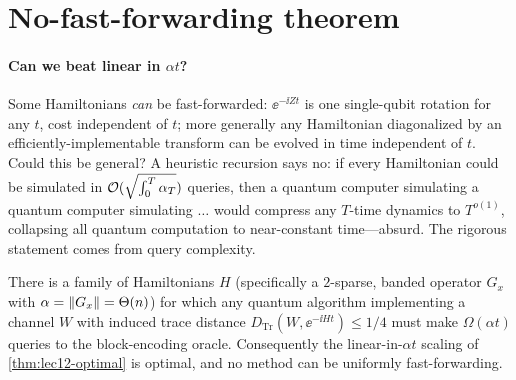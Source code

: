 \section{No-fast-forwarding theorem}
\label{sec:lec12-5}

\paragraph{Can we beat linear in $\alpha t$?}
Some Hamiltonians \emph{can} be fast-forwarded: $\ee^{-\ii Zt}$ is one single-qubit
rotation for any $t$, cost independent of $t$; more generally any Hamiltonian diagonalized
by an efficiently-implementable transform can be evolved in time independent of $t$. Could
this be general? A heuristic recursion says no: if every Hamiltonian could be simulated in
$\mathcal{O}(\sqrt{\int_0^T\alpha_T})$ queries, then a quantum computer simulating a quantum
computer simulating $\dots$ would compress any $T$-time dynamics to $T^{o(1)}$, collapsing
all quantum computation to near-constant time---absurd. The rigorous statement comes from
query complexity.

\begin{theorem}
\label{thm:lec12-nofastforward}
There is a family of Hamiltonians $H$ (specifically a $2$-sparse, banded operator $G_x$
with $\alpha=\left\lVert G_x \right\rVert=\Theta(n)$) for which any quantum algorithm implementing a channel
$W$ with induced trace distance $D_{\mathrm{Tr}}(W,\ee^{-\ii Ht})\le1/4$ must make
$\Omega(\alpha t)$ queries to the block-encoding oracle. Consequently the linear-in-$\alpha t$
scaling of \cref{thm:lec12-optimal} is optimal, and no method can be uniformly
fast-forwarding.
\end{theorem}

